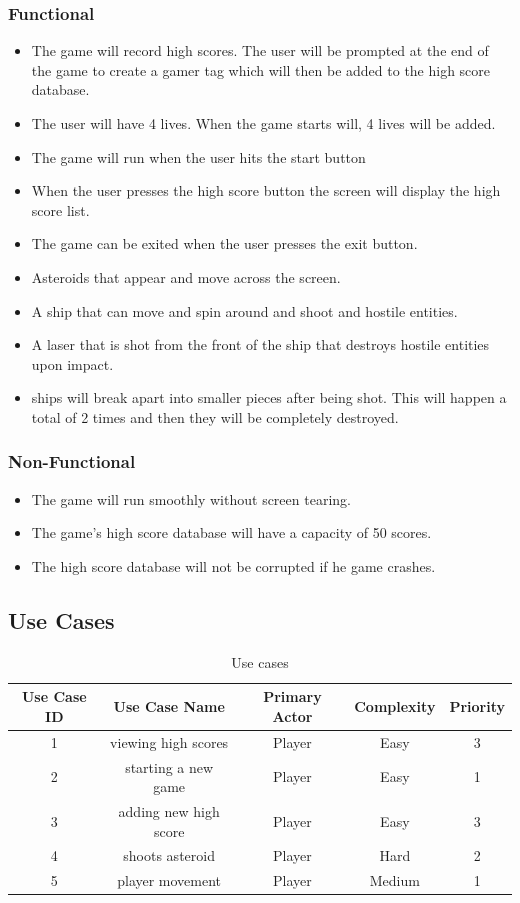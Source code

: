 \documentclass[10pt,conference,onecolumn,compsoc]{IEEEtran}
\begin{document}
\subsubsection{Functional}
\begin{itemize}
\item The game will record high scores. The user will be prompted at the end of the game to create a gamer tag which will then be added to the high score database.
\item The user will have 4 lives. When the game starts will, 4 lives will be added.
\item The game will run when the user hits the start button
\item When the user presses the high score button the screen will display the high score list.
\item The game can be exited when the user presses the exit button.
\item Asteroids that appear and move across the screen.
\item A ship that can move and spin around and shoot and hostile entities.
\item A laser that is shot from the front of the ship that destroys hostile entities upon impact.
\item ships will break apart into smaller pieces after being shot. This will happen a total of 2 times and then they will be completely destroyed.
\end{itemize}

\subsubsection{Non-Functional}
\begin{itemize}
\item The game will run smoothly without screen tearing.
\item The game's high score database will have a capacity of 50 scores.
\item The high score database will not be corrupted if he game crashes.
\end{itemize}

\subsection{Use Cases}

\begin{table}
\centering
\begin{tabular}{|c|c|c|c|c|}
\hline
Use Case ID & Use Case Name & Primary Actor & Complexity & Priority \\
\hline \hline
1 & viewing high scores & Player & Easy & 3\\
\hline
2 & starting a new game & Player & Easy & 1\\
\hline
3 & adding new high score & Player & Easy & 3\\
\hline
4 & shoots asteroid  & Player & Hard & 2\\
\hline
5 & player movement & Player & Medium & 1\\
\hline

\end{tabular}
\caption{Use cases}
\label{tab:useCaseIndex}
\end{table}
\end{document}
